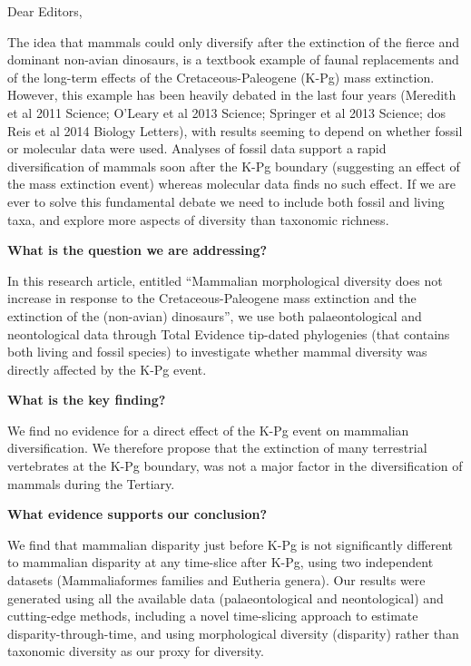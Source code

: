 \documentclass[11pt]{letter}
\begin{document}
\begin{letter}{}
\opening{Dear Editors,}

The idea that mammals could only diversify after the extinction of the fierce and dominant non-avian dinosaurs, is a textbook example of faunal replacements and of the long-term effects of the Cretaceous-Paleogene (K-Pg) mass extinction.
However, this example has been heavily debated in the last four years (Meredith et al 2011 Science; O'Leary et al 2013 Science; Springer et al 2013 Science; dos Reis et al 2014 Biology Letters), with results seeming to depend on whether fossil or molecular data were used.
Analyses of fossil data support a rapid diversification of mammals soon after the K-Pg boundary (suggesting an effect of the mass extinction event) whereas molecular data finds no such effect.
If we are ever to solve this fundamental debate we need to include both fossil and living taxa, and explore more aspects of diversity than taxonomic richness.

\textbf{What is the question we are addressing?}

In this research article, entitled ``Mammalian morphological diversity does not increase in response to the Cretaceous-Paleogene mass extinction and the extinction of the (non-avian) dinosaurs'', we use both palaeontological and neontological data through Total Evidence tip-dated phylogenies (that contains both living and fossil species) to investigate whether mammal diversity was directly affected by the K-Pg event.

\textbf{What is the key finding?}

We find no evidence for a direct effect of the K-Pg event on mammalian diversification.
We therefore propose that the extinction of many terrestrial vertebrates at the K-Pg boundary, was not a major factor in the diversification of mammals during the Tertiary. 

\textbf{What evidence supports our conclusion?}

We find that mammalian disparity just before K-Pg is not significantly different to mammalian disparity at any time-slice after K-Pg, using two independent datasets (Mammaliaformes families and Eutheria genera).
Our results were generated using all the available data (palaeontological and neontological) and cutting-edge methods, including a novel time-slicing approach to estimate disparity-through-time, and using morphological diversity (disparity) rather than taxonomic diversity as our proxy for diversity.



\end{letter}
\end{document}
